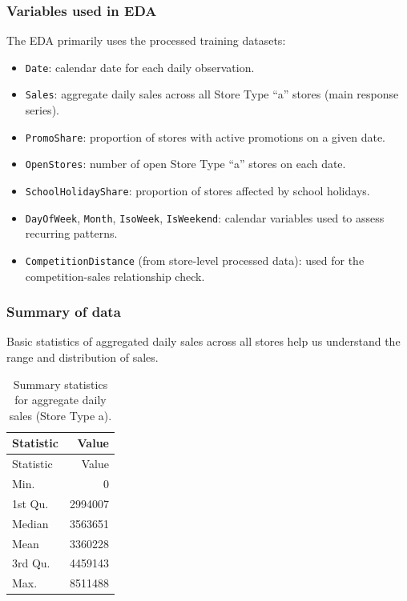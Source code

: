\documentclass[
  12pt,
]{article}
\providecommand{\tightlist}{%
  \setlength{\itemsep}{0pt}\setlength{\parskip}{0pt}}
\begin{document}
\subsubsection{Variables used in EDA}\label{variables-used-in-eda}

The EDA primarily uses the processed training datasets:

\begin{itemize}
\tightlist
\item
  \texttt{Date}: calendar date for each daily observation.
\item
  \texttt{Sales}: aggregate daily sales across all Store Type ``a''
  stores (main response series).
\item
  \texttt{PromoShare}: proportion of stores with active promotions on a
  given date.
\item
  \texttt{OpenStores}: number of open Store Type ``a'' stores on each
  date.
\item
  \texttt{SchoolHolidayShare}: proportion of stores affected by school
  holidays.
\item
  \texttt{DayOfWeek}, \texttt{Month}, \texttt{IsoWeek},
  \texttt{IsWeekend}: calendar variables used to assess recurring
  patterns.
\item
  \texttt{CompetitionDistance} (from store-level processed data): used
  for the competition-sales relationship check.
\end{itemize}

\subsubsection{Summary of data}\label{summary-of-data}

Basic statistics of aggregated daily sales across all stores help us
understand the range and distribution of sales.

\begin{longtable}[]{@{}lr@{}}
\caption{Summary statistics for aggregate daily sales (Store Type
a).}\tabularnewline
\toprule\noalign{}
Statistic & Value \\
\midrule\noalign{}
\endfirsthead
\toprule\noalign{}
Statistic & Value \\
\midrule\noalign{}
\endhead
\bottomrule\noalign{}
\endlastfoot
Min. & 0 \\
1st Qu. & 2994007 \\
Median & 3563651 \\
Mean & 3360228 \\
3rd Qu. & 4459143 \\
Max. & 8511488 \\
\end{longtable}
\end{document}
